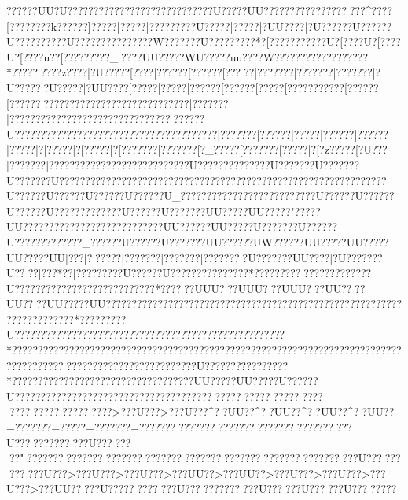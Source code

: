 {{{{{{{{{{{{{{{{{{{{{{{{{{{{{{{{{{{{{{{{{{{{{{{{{{{{{{{{{{{{{{{{{{{{{{{{{{{{{{{{{{{{{{{{{{{{{{{{{{{{{{{{{{{{{{{{{{{{{{{{{{{{{{{{{{{{{{{{{{{{{{{{{{{{{{{{{{{{{{{{{{{{{{{{{{{{{{{{{{{{{{{{{{{{{{{{{{{{{{{{{{{{{{{{{{{{{{{{{{{{{{{{{{{{{{{{{{{{{{{{{{{{{{{{{{{{{{{{{{{{{{{{{{{{{{{{{{{{{{{{{{{{{{{{{{{{{{{{{{{{{{{{{{{{{{{{{{{{{{{{{{{{{{{{{{{{{{{{{{{{{{{{{{{{{{{{{{{{{{{{{{{{{{{{{{{{{{{{{{{{{{{{{{{{{{{{{{{{{{{{{{{{{{{{{{{{{{{{{{{{{{{{{{{{{{{{{{{{{{{{{{{{{{{{{{{{{{{{{{{{{{{{{{{{{{{{{{{{{{{{{{{{{{{{{{{{{{{{{{{{{{{{{{{{{{{{{{{{{??????UU?U????????????????????????????U?????UU????????????{??????{?^?? ??[???????{?k?????{?]?????|?????|??? ???{???U?????|?????|?UU????|?U???{???U???{???U???{?  ??????U???????????????W???????U??????? ??*?[???????{????U?[????U?[????U?[????u??[? ?????{???_?{???UU??{???WU??{???uu??{??W???{???????{?????{??? *?????  ??{??z????|?U?????[?? ??[???? ??[???? ??[??? ??|???????|???????|???????|?U?????|?U?????|?UU????[???  ??[???  ??[???? ??[???? ??[??? ??[??? ??{???? ??[???? ??[???? ??|???????{?????{???????{?????????|???????|??????{???????{???????{???????{????{??????U??{???? ??{???????{???? ??{???? ??{???? ??{???? ??|???????|?????{?|????{?|?????{?|?????{?|?????|?[?????|?[?????|?[???????[???????[?_?????[???????[?????|?[?z?????[?U???[???????[?????{???  ????{???????{???????{?U?????{?????????U???????U???????U???????U???????????????????????????????????????????????????????????????U??????U??????U??????U??????U_??????????????????????????U??????U??????U??????U?????????? ???U??????U???????UU?????UU?????  "?????UU???????????????????????????UU??????UU?????U???????U??????U?????????????_??????U??????U???????UU??????UW??????UU?????UU?????UU?????UU]???|??????|???????|???????|???????|?U???????UU????|?U???????U????|???* ??[??   ??{??   ???U??????U?????????? ?????* ?????  ????  ????   ?????  ????U????????  ?????  ?????  ?????  ????*  ????   ??UUU???UUU???UUU???UU????UU????UU?????UU????????????????? ??????? ??????? ??????? ??????? ??????? ?????
  ?????????????*?????? ???U????????????????????????????????????????????????????*  ??????  ??????  ??????  ??????  ??????? ??????? ????? ??????? ????????????????????????????? ????????????? ???????????????????U?? ??????????????*???????????????????????????????????UU?????UU?????U??????U??????????????????????????????????????????? ????? ????? ????
 ????  ?????  ?????  ????  >???U???>???U???^??UU??^??UU??^??UU??^??UU??=???????=?????=???????=??????????????????????????????????????U?????????????U????????"???????????????????????????????????????????????????????????U????????????U???>???U???>???U???>???UU??>???UU??>???U???>???U???>???U???>???UU?????U?????? ??????U?????????????U??????U??????U????????
}}}}}}}}}}}}}}}}}}}}}}}}}}}}}}}}}}}}}}}}}}}}}}}}}}}}}}}}}}}}}}}}}}}}}}}}}}}}}}}}}}}}}}}}}}}}}}}}}}}}}}}}}}}}}}}}}}}}}}}}}}}}}}}}}}}}}}}}}}}}}}}}}}}}}}}}}}}}}}}}}}}}}}}}}}}}}}}}}}}}}}}}}}}}}}}}}}}}}}}}}}}}}}}}}}}}}}}}}}}}}}}}}}}}}}}}}}}}}}}}}}}}}}}}}}}}}}}}}}}}}}}}}}}}}}}}}}}}}}}}}}}}}}}}}}}}}}}}}}}}}}}}}}}}}}}}}}}}}}}}}}}}}}}}}}}}}}}}}}}}}}}}}}}}}}}}}}}}}}}}}}}}}}}}}}}}}}}}}}}}}}}}}}}}}}}}}}}}}}}}}}}}}}}}}}}}}}}}}}}}}}}}}}}}}}}}}}}}}}}}}}}}}}}}}}}}}}}}}}}}}}}}}}}}}}}}}}}}}}}}}}}}}}}}}}}}}}}}}}}}}}}}}}}}}}}}}}}}}}}}}}}}}}}}}}}}}}}}}}}}}}}}}}}}}}}}}}}}}}}}
